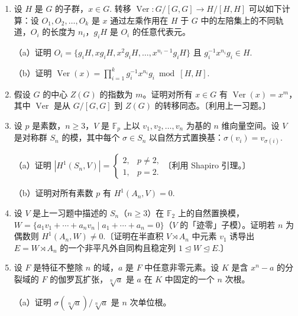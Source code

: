 \begin{enumerate}
（c）证明若 \(G\) 没有指数为 2 的子群，则 \(\operatorname{Ver}(x) \in M/[T,T]\). 由此证明对某个 \(g \in G\) 有 \(g^{-1}xg \in M\).〔在 2 阶群 \(T/M\) 中考虑乘积 \(\operatorname{Ver}(x)\).〕

\item 设 \(H\) 是 \(G\) 的子群，\(x \in G\). 转移 \(\operatorname{Ver} : G/[G,G] \to H/[H,H]\) 可以如下计算：设 \(O_1, O_2, \ldots, O_k\) 是 \(x\) 通过左乘作用在 \(H\) 于 \(G\) 中的左陪集上的不同轨道，\(O_i\) 的长度为 \(n_i\)，\(g_iH\) 是 \(O_i\) 的任意代表元。

（a）证明 \(O_i = \{g_iH, xg_iH, x^2g_iH, \ldots, x^{n_i-1}g_iH\}\) 且 \(g_i^{-1}x^{n_i}g_i \in H\).

（b）证明 \(\operatorname{Ver}(x) = \prod_{i=1}^{k}g_i^{-1}x^{n_i}g_i \bmod [H,H]\).

\item 假设 \(G\) 的中心 \(Z(G)\) 的指数为 \(m\)。证明对所有 \(x \in G\) 有 \(\operatorname{Ver}(x) = x^m\)，其中 \(\operatorname{Ver}\) 是从 \(G/[G,G]\) 到 \(Z(G)\) 的转移同态。〔利用上一习题。〕

\item 设 \(p\) 是素数，\(n \geq 3\)，\(V\) 是 \(\mathbb{F}_p\) 上以 \(v_1, v_2, \ldots, v_n\) 为基的 \(n\) 维向量空间。设 \(V\) 是对称群 \(S_n\) 的模，其中每个 \(\sigma \in S_n\) 以自然方式置换基：\(\sigma(v_i) = v_{\sigma(i)}\).

（a）证明 \(|H^1(S_n, V)| = \begin{cases}2, & p \neq 2,\\ 1, & p = 2.\end{cases}\)〔利用 Shapiro 引理。〕

（b）证明对所有素数 \(p\) 有 \(H^1(A_n, V) = 0\).

\item 设 \(V\) 是上一习题中描述的 \(S_n\)（\(n \geq 3\)）在 \(\mathbb{F}_2\) 上的自然置换模，\(W = \{a_1v_1+\cdots+a_nv_n \mid a_1+\cdots+a_n = 0\}\)（\(V\) 的「迹零」子模）。证明若 \(n\) 为偶数则 \(H^1(A_n, W) \neq 0\).〔证明在半直积 \(V \rtimes A_n\) 中元素 \(v_1\) 诱导出 \(E = W \rtimes A_n\) 的一个非平凡外自同构且稳定列 \(1 \trianglelefteq W \trianglelefteq E\).〕

\item 设 \(F\) 是特征不整除 \(n\) 的域，\(a\) 是 \(F\) 中任意非零元素。设 \(K\) 是含 \(x^n-a\) 的分裂域的 \(F\) 的伽罗瓦扩张，\(\sqrt[n]{a}\) 是 \(a\) 在 \(K\) 中固定的一个 \(n\) 次根。

（a）证明 \(\sigma(\sqrt[n]{a})/\sqrt[n]{a}\) 是 \(n\) 次单位根。


\end{enumerate}
